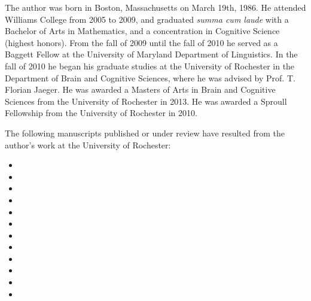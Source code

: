 \begin{curriculumvitae}
  The author was born in Boston, Massachusetts on March 19th, 1986. He attended
  Williams College from 2005 to 2009, and graduated \emph{summa cum laude} with
  a Bachelor of Arts in Mathematics, and a concentration in Cognitive Science
  (highest honors). From the fall of 2009 until the fall of 2010 he served as a
  Baggett Fellow at the University of Maryland Department of Linguistics. In the
  fall of 2010 he began his graduate studies at the University of Rochester in
  the Department of Brain and Cognitive Sciences, where he was advised by
  Prof. T. Florian Jaeger. He was awarded a Masters of Arts in Brain and
  Cognitive Sciences from the University of Rochester in 2013. He was awarded a
  Sproull Fellowship from the University of Rochester in 2010.

  The following manuscripts published or under review have resulted from the
  author's work at the University of Rochester:

  \begin{itemize}
  \item {}
  \item {}
  \item {}
  \item {}
  \item {}
  \item {}
  \item {}
  \item {}
  \item {}
  \item {}
  \item {}
  \item {}
  \end{itemize}

\end{curriculumvitae}
